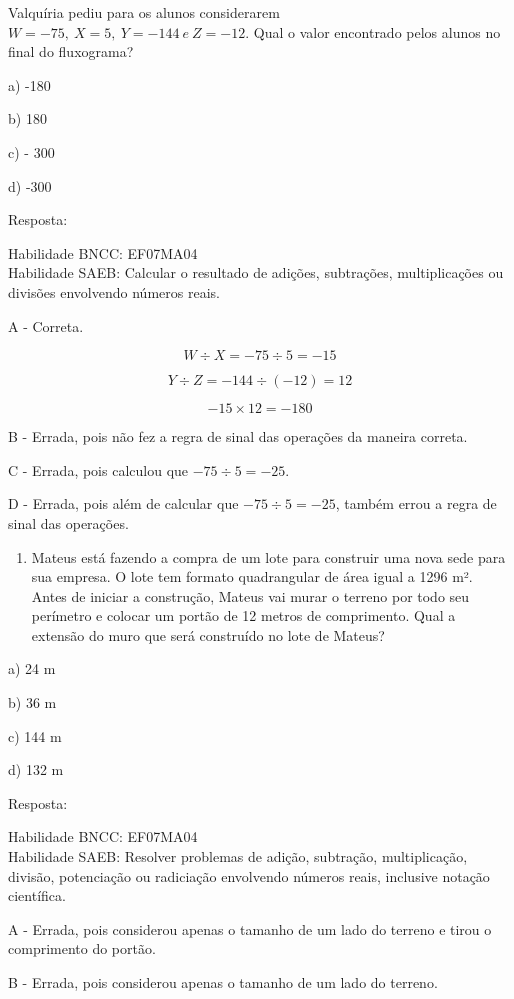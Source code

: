 {{Valquíria pediu para os alunos considerarem
\(W = - 75,\ X = 5,\ Y = - 144\ e\ Z = - 12\). Qual o valor encontrado
pelos alunos no final do fluxograma?

a) -180

b) 180

c) - 300

d) -300

Resposta:

Habilidade BNCC: EF07MA04\\
Habilidade SAEB: Calcular o resultado de adições, subtrações,
multiplicações ou divisões envolvendo números reais.

A - Correta.

\[W \div X = - 75 \div 5 = - 15\]

\[Y \div Z = - 144 \div ( - 12) = 12\]

\[- 15 \times 12 = - 180\]

B - Errada, pois não fez a regra de sinal das operações da maneira
correta.

C - Errada, pois calculou que \(- 75 \div 5 = - 25\).

D - Errada, pois além de calcular que \(- 75 \div 5 = - 25\), também
errou a regra de sinal das operações.

\begin{enumerate}
\def\labelenumi{\arabic{enumi})}
\setcounter{enumi}{2}
\tightlist
\item
  Mateus está fazendo a compra de um lote para construir uma nova sede
  para sua empresa. O lote tem formato quadrangular de área igual a 1296
  m². Antes de iniciar a construção, Mateus vai murar o terreno por todo
  seu perímetro e colocar um portão de 12 metros de comprimento. Qual a
  extensão do muro que será construído no lote de Mateus?
\end{enumerate}

a) 24 m

b) 36 m

c) 144 m

d) 132 m

Resposta:

Habilidade BNCC: EF07MA04\\
Habilidade SAEB: Resolver problemas de adição, subtração, multiplicação,
divisão, potenciação ou radiciação envolvendo números reais, inclusive
notação científica.

A - Errada, pois considerou apenas o tamanho de um lado do terreno e
tirou o comprimento do portão.

B - Errada, pois considerou apenas o tamanho de um lado do terreno.

}}
